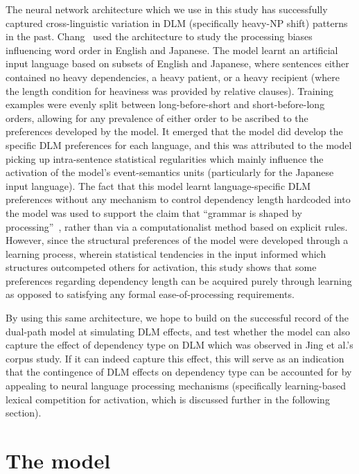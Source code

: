 \documentclass{article}
\begin{document}
\vspace{5mm}

The neural network architecture which we use in this study has successfully captured cross-linguistic variation in DLM (specifically heavy-NP shift) patterns in the past. Chang~\cite{chang2009} used the architecture to study the processing biases influencing word order in English and Japanese. The model learnt an artificial input language based on subsets of English and Japanese, where sentences either contained no heavy dependencies, a heavy patient, or a heavy recipient (where the length condition for heaviness was provided by relative clauses). Training examples were evenly split between long-before-short and short-before-long orders, allowing for any prevalence of either order to be ascribed to the preferences developed by the model. It emerged that the model did develop the specific DLM preferences for each language, and this was attributed to the model picking up intra-sentence statistical regularities which mainly influence the activation of the model's event-semantics units (particularly for the Japanese input language). The fact that this model learnt language-specific DLM preferences without any mechanism to control dependency length hardcoded into the model was used to support the claim that ``grammar is shaped by processing''~\cite{hawkins2004}, rather than via a computationalist method based on explicit rules. However, since the structural preferences of the model were developed through a learning process, wherein statistical tendencies in the input informed which structures outcompeted others for activation, this study shows that some preferences regarding dependency length can be acquired purely through learning as opposed to satisfying any formal ease-of-processing requirements.

By using this same architecture, we hope to build on the successful record of the dual-path model at simulating DLM effects, and test whether the model can also capture the effect of dependency type on DLM which was observed in Jing et al.'s corpus study. If it can indeed capture this effect, this will serve as an indication that the contingence of DLM effects on dependency type can be accounted for by appealing to neural language processing mechanisms (specifically learning-based lexical competition for activation, which is discussed further in the following section).


\section{The model}
\end{document}

